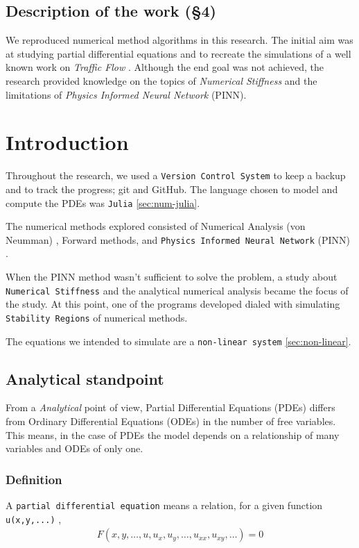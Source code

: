 \documentclass[11pt]{article}
\begin{document}
\subsection{Description of the work (§4)}
\label{sec:org0ef3cc3}

We reproduced numerical method algorithms in this research. The initial
aim was at studying partial differential equations and to
recreate the simulations of a well known work on \emph{Traffic Flow}
\cite{kerner1993}. Although the end goal was not achieved, the
research provided knowledge on the topics of \emph{Numerical Stiffness} and
the limitations of \emph{Physics Informed Neural Network} (PINN).

\section{Introduction}
\label{sec:org9a48815}

Throughout the research, we used a \texttt{Version Control System} to keep a backup and
to track the progress; git and GitHub. The language chosen to model and compute
the PDEs was \texttt{Julia} \ref{sec:num-julia}.

The numerical methods explored consisted of Numerical
Analysis (von Neumman) \cite{press1986numerical}, Forward methods, and \texttt{Physics
Informed Neural Network} (PINN) \cite{zubov2021neuralpde}.

When the PINN method wasn't sufficient to solve the problem, a study about
\texttt{Numerical Stiffness} and the analytical numerical analysis became the focus of
the study. At this point, one of the programs developed dialed with simulating
\texttt{Stability Regions} of numerical methods.

The equations we intended to simulate are a \texttt{non-linear system} \ref{sec:non-linear}.

\subsection{Analytical standpoint}
\label{sec:org9fa64de}
From a \emph{Analytical} point of view, Partial Differential Equations
(PDEs) differs from Ordinary Differential Equations (ODEs) in the
number of free variables. This means, in the case of PDEs the model depends on a
relationship of many variables and ODEs of only one.

\subsubsection{Definition}
\label{sec:org47decfd}
A \texttt{partial differential equation} means a relation, for a given function
\texttt{u(x,y,...)} \cite{john1978partial},
\begin{equation}
\label{eq:PDE}
\begin{aligned}
F(x,y,\ldots ,u,u_{x}, u_{y}, \ldots, u_{xx}, u_{xy}, \ldots{})=0
\end{aligned}
\end{equation}
\end{document}
